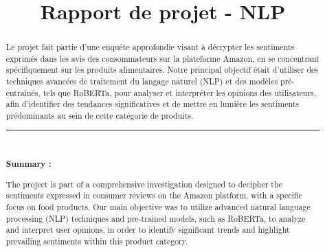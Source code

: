 \documentclass{rapportCS}
\title{Rapport de projet - NLP}
\begin{document}







        
\fairemarges %
\fairepagedegarde %

\begin{center}
	\begin{abstract}
       
        Le projet fait partie d'une enquête approfondie visant à décrypter les sentiments exprimés dans les avis des consommateurs sur la plateforme Amazon, en se concentrant spécifiquement sur les produits alimentaires. Notre principal objectif était d'utiliser des techniques avancées de traitement du langage naturel (NLP) et des modèles pré-entraînés, tels que RoBERTa, pour analyser et interpréter les opinions des utilisateurs, afin d'identifier des tendances significatives et de mettre en lumière les sentiments prédominants au sein de cette catégorie de produits. 
        
        \rule{\linewidth}{0.2 mm} \\[0.4 cm]
        \begin{center}\textbf{Summary :}\end{center} 
        The project is part of a comprehensive investigation designed to decipher the sentiments expressed in consumer reviews on the Amazon platform, with a specific focus on food products. Our main objective was to utilize advanced natural language processing (NLP) techniques and pre-trained models, such as RoBERTa, to analyze and interpret user opinions, in order to identify significant trends and highlight prevailing sentiments within this product category.
    \end{abstract}
\end{center}
\newpage
\end{document}
